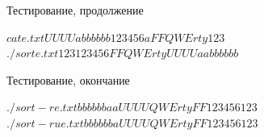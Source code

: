 \documentclass[unknownkeysallowed,xcolor=table]{beamer}
\begin{document}
\begin{frame}[fragile]{Тестирование, продолжение}

\begin{cmdline}
$ cat e.txt
UUUU
a
bbbbbb
123456
a
FF
QWErty
123
$
$ ./sort e.txt
123
123456
FF
QWErty
UUUU
a
a
bbbbbb
$
\end{cmdline}

\end{frame}

\begin{frame}[fragile]{Тестирование, окончание}

\begin{cmdline}
$ ./sort -r e.txt
bbbbbb
a
a
UUUU
QWErty
FF
123456
123
$
$ ./sort -ru e.txt
bbbbbb
a
UUUU
QWErty
FF
123456
123
$
\end{cmdline}

\end{frame}
\end{document}
